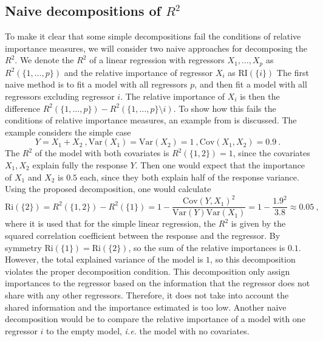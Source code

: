 \subsection{Naive decompositions of $R^2$}
\label{sec:naive_decomp}
To make it clear that some simple decompositions fail the conditions of relative importance measures, we will consider two naive approaches for decomposing the $R^2$. 
We denote the $R^2$ of a linear regression with regressors $X_1, \dots, X_p$ as $R^2(\{1, \dots, p\})$ and the relative importance of regressor $X_i$ as $\text{RI}(\{i\})$
\newline
\newline
The first naive method is to fit a model with all regressors $p$, and then fit a model with all regressors excluding regressor $i$. The relative importance of $X_i$ is then the difference $R^2(\{1, \dots, p\}) - R^2(\{1, \dots, p\} \setminus i)$.
To show how this fails the conditions of relative importance measures, an example from \citet{matre} is discussed. The example considers the simple case 
\begin{equation}
    Y=X_1+X_2 \ , \text{Var}(X_1) = \text{Var}(X_2)=1 \ , \text{Cov}(X_1, X_2)=0.9 \ .
\end{equation}
The $R^2$ of the model with both covariates is $R^2(\{1, 2\})=1$, since the covariates $X_1, X_2$ explain fully the response $Y$. Then one would expect that the importance of $X_1$ and $X_2$ is $0.5$ each, since they both explain half of the response variance.
Using the proposed decomposition, one would calculate
\begin{equation}
    \text{Ri}(\{2\}) = R^2(\{1, 2\}) - R^2(\{1\}) = 1 - \frac{\text{Cov}(Y, X_1)^2}{\text{Var}(Y)\text{Var}(X_1)} = 1- \frac{1.9^2}{3.8} \approx 0.05 \ ,
\end{equation}
where it is used that for the simple linear regression, the $R^2$ is given by the squared correlation coefficient between the response and the regressor.
By symmetry $\text{Ri}(\{1\})=\text{Ri}(\{2\})$, so the sum of the relative importances is $0.1$. However, the total explained variance of the model is $1$, so this decomposition violates the proper decomposition condition.
This decomposition only assign importances to the regressor based on the information that the regressor does not share with any other regressors. Therefore, it does not take into account the shared information and the importance estimated is too low.
\newline
\newline
Another naive decomposition would be to compare the relative importance of a model with one regressor $i$ to the empty model, \textit{i.e.} the model with no covariates. 
